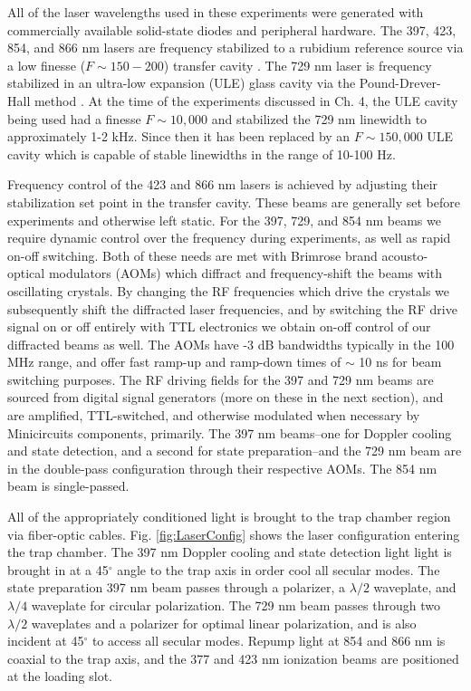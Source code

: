All of the laser wavelengths used in these experiments were generated with commercially available solid-state diodes and peripheral hardware. The 397, 423, 854, and 866 nm lasers are frequency stabilized to a rubidium reference source via a low finesse ($F \sim 150-200$) transfer cavity \cite{doi:10.1063/1.2337094}. The 729 nm laser is frequency stabilized in an ultra-low expansion (ULE) glass cavity via the Pound-Drever-Hall method \cite{doi:10.1119/1.1286663}. At the time of the experiments discussed in Ch. 4, the ULE cavity being used had a finesse $F \sim 10,000$ and stabilized the 729 nm linewidth to approximately 1-2 kHz. Since then it has been replaced by an $F \sim 150,000$ ULE cavity which is capable of stable linewidths in the range of 10-100 Hz.  

Frequency control of the 423 and 866 nm lasers is achieved by adjusting their stabilization set point in the transfer cavity. These beams are generally set before experiments and otherwise left static. For the 397, 729, and 854 nm beams we require dynamic control over the frequency during experiments, as well as rapid on-off switching. Both of these needs are met with Brimrose brand acousto-optical modulators (AOMs) which diffract and frequency-shift the beams with oscillating crystals. By changing the RF frequencies which drive the crystals we subsequently shift the diffracted laser frequencies, and by switching the RF drive signal on or off entirely with TTL electronics we obtain on-off control of our diffracted beams as well. The AOMs have -3 dB bandwidths typically in the 100 MHz range, and offer fast ramp-up and ramp-down times of $\sim$ 10 ns for beam switching purposes. The RF driving fields for the 397 and 729 nm beams are sourced from digital signal generators (more on these in the next section), and are amplified, TTL-switched, and otherwise modulated when necessary by Minicircuits components, primarily. 
The 397 nm beams--one for Doppler cooling and state detection, and a second for state preparation--and the 729 nm beam are in the double-pass configuration through their respective AOMs. The 854 nm beam is single-passed.

All of the appropriately conditioned light is brought to the trap chamber region via fiber-optic cables. Fig. \ref{fig:LaserConfig} shows the laser configuration entering the trap chamber. The 397 nm Doppler cooling and state detection light light is brought in at a 45$^{\circ}$ angle to the trap axis in order cool all secular modes. The state preparation 397 nm beam passes through a polarizer, a $\lambda/2$ waveplate, and $\lambda/4$ waveplate for circular polarization. The 729 nm beam passes through two $\lambda/2$ waveplates and a polarizer for optimal linear polarization, and is also incident at 45$^{\circ}$ to access all secular modes. Repump light at 854 and 866 nm is coaxial to the trap axis, and the 377 and 423 nm ionization beams are positioned at the loading slot. 

